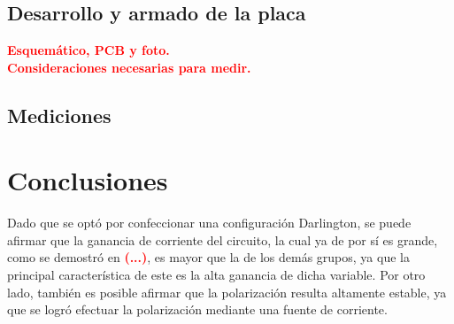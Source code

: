 \subsection{Desarrollo y armado de la placa}
\begin{center}
	\LARGE{\textcolor{red}{\textbf{Esquemático, PCB y foto.}}}\\
	\LARGE{\textcolor{red}{\textbf{Consideraciones necesarias para medir.}}}
\end{center}

\subsection{Mediciones}

\section{Conclusiones}
Dado que se optó por confeccionar una configuración Darlington, se puede afirmar que la ganancia de corriente del circuito, la cual ya de por sí es grande, como se demostró en \textcolor{red}{\textbf{(...)}}, es mayor que la de los demás grupos, ya que la principal característica de este es la alta ganancia de dicha variable. Por otro lado, también es posible afirmar que la polarización resulta altamente estable, ya que se logró efectuar la polarización mediante una fuente de corriente.
	
